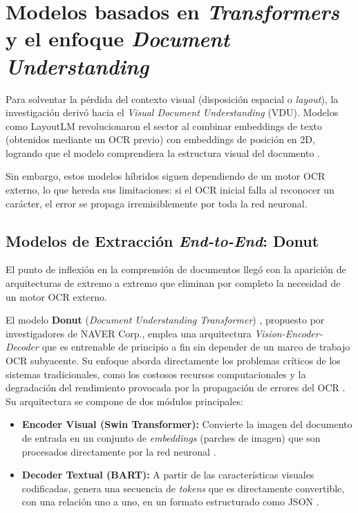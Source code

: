 \section{Modelos basados en \textit{Transformers} y el enfoque \textit{Document Understanding}}
Para solventar la pérdida del contexto visual (disposición espacial o \textit{layout}), la investigación derivó hacia el \textit{Visual Document Understanding} (VDU). Modelos como LayoutLM revolucionaron el sector al combinar embeddings de texto (obtenidos mediante un OCR previo) con embeddings de posición en 2D, logrando que el modelo comprendiera la estructura visual del documento \parencite{maciel2022extraccion}. 

Sin embargo, estos modelos híbridos siguen dependiendo de un motor OCR externo, lo que hereda sus limitaciones: si el OCR inicial falla al reconocer un carácter, el error se propaga irremisiblemente por toda la red neuronal.

\subsection{Modelos de Extracción \textit{End-to-End}: Donut}
El punto de inflexión en la comprensión de documentos llegó con la aparición de arquitecturas de extremo a extremo que eliminan por completo la necesidad de un motor OCR externo. 

El modelo \textbf{Donut} (\textit{Document Understanding Transformer}) \parencite{kim2021donut}, propuesto por investigadores de NAVER Corp., emplea una arquitectura \textit{Vision-Encoder-Decoder} que es entrenable de principio a fin sin depender de un marco de trabajo OCR subyacente. Su enfoque aborda directamente los problemas críticos de los sistemas tradicionales, como los costosos recursos computacionales y la degradación del rendimiento provocada por la propagación de errores del OCR \parencite{kim2021donut}. Su arquitectura se compone de dos módulos principales:
\begin{itemize}
    \item \textbf{Encoder Visual (Swin Transformer):} Convierte la imagen del documento de entrada en un conjunto de \textit{embeddings} (parches de imagen) que son procesados directamente por la red neuronal \parencite{kim2021donut}.
    \item \textbf{Decoder Textual (BART):} A partir de las características visuales codificadas, genera una secuencia de \textit{tokens} que es directamente convertible, con una relación uno a uno, en un formato estructurado como JSON \parencite{kim2021donut}.
\end{itemize}

